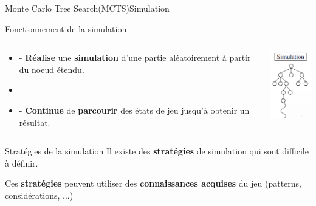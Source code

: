 \begin{frame}{Monte Carlo Tree Search(MCTS)}{Simulation}
	\begin{block}{Fonctionnement de la simulation}
		\begin{columns}
			\begin{column}{7cm}
				\begin{itemize}
					\item - \textbf{Réalise} une \textbf{simulation} d'une partie aléatoirement à partir du noeud étendu.
					\item \
					\item - \textbf{Continue} de \textbf{parcourir} des états de jeu jusqu'à obtenir un résultat.

				\end{itemize}
			\end{column}
			\begin{column}{3cm}
				\includegraphics[width=2.2cm]{ressources/MCTS/Simulation.png}
			\end{column}
		\end{columns}
	\end{block}
	\begin{block}{Stratégies de la simulation}
		Il existe des \textbf{stratégies} de simulation qui sont difficile à définir.

		Ces \textbf{stratégies} peuvent utiliser des \textbf{connaissances acquises} du jeu (patterns, considérations, ...)
	\end{block}
\end{frame}

